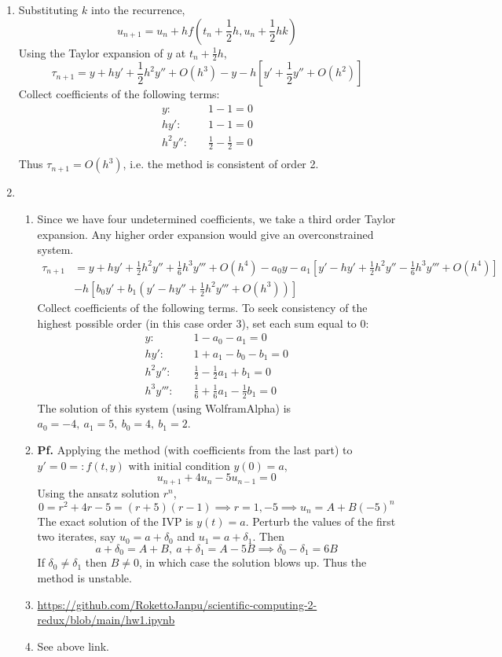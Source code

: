 \documentclass{article}
\def\tbf#1{\textbf{#1}}
\newcommand{\br}[1]{\left(#1\right)}
\newcommand{\sbr}[1]{\left[#1\right]}
\newcommand{\pf}{\tbf{Pf. }}
\newcommand{\imp}{\implies}
\begin{document}
\begin{enumerate}
\item Substituting $k$ into the recurrence,
$$u_{n+1} = u_n + hf\br{t_n+\frac12h,u_n+\frac12hk}$$
Using the Taylor expansion of $y$ at $t_n+\frac12h$,
$$\tau_{n+1} = y + hy' + \frac12h^2y'' + O(h^3) - y - h\sbr{y' + \frac12y'' + O(h^2)}$$
Collect coefficients of the following terms:
\begin{align*}
	y: &\quad 1 - 1 = 0 \\
	hy': &\quad 1 - 1 = 0 \\
	h^2y'': &\quad \frac12 - \frac12 = 0 \\
\end{align*}
Thus $\tau_{n+1}=O(h^3)$, i.e. the method is consistent of order 2.



\item

\begin{enumerate}[label=(\alph*)]
	
	\item Since we have four undetermined coefficients, we take a third order Taylor expansion. Any higher order expansion would give an overconstrained system.
	\begin{align*}
		\tau_{n+1} &= y + hy' + \frac12h^2y'' + \frac16h^3y''' + O(h^4) - a_0y - a_1\sbr{y' - hy' + \frac12h^2y'' - \frac16h^3y''' + O(h^4)}\\
		& - h\sbr{b_0y' + b_1\br{y' - hy'' + \frac12h^2y''' + O(h^3)}}
	\end{align*}
	Collect coefficients of the following terms. To seek consistency of the highest possible order (in this case order 3), set each sum equal to 0:
	\begin{align*}
		y: &\quad 1 - a_0 - a_1 = 0 \\
		hy': &\quad 1 + a_1 - b_0 - b_1 = 0 \\
		h^2y'': &\quad \frac12 - \frac12a_1 + b_1 = 0 \\
		h^3y''': &\quad \frac16+ \frac16a_1 - \frac12b_1 = 0
	\end{align*}
	The solution of this system (using WolframAlpha) is $a_0=-4,~a_1=5,~b_0=4,~b_1=2$.
	
	
	\item \pf Applying the method (with coefficients from the last part) to $y'=0=:f(t,y)$ with initial condition $y(0)=a$,
	$$u_{n+1} + 4u_n - 5u_{n-1} = 0$$
	Using the ansatz solution $r^n$,
	$$0 = r^2+4r-5 = (r+5)(r-1)
	\imp r=1,-5
	\imp u_n = A + B(-5)^n$$
	The exact solution of the IVP is $y(t)=a$. Perturb the values of the first two iterates, say $u_0=a+\delta_0$ and $u_1=a+\delta_1$. Then
	$$a+\delta_0 = A+B,~a+\delta_1 = A-5B
	\imp \delta_0 - \delta_1 = 6B$$
	If $\delta_0\ne\delta_1$ then $B\ne0$, in which case the solution blows up. Thus the method is unstable.
	
	
	\item \url{https://github.com/RokettoJanpu/scientific-computing-2-redux/blob/main/hw1.ipynb}
	
	\item See above link.
	
\end{enumerate}



\end{enumerate}
\end{document}
